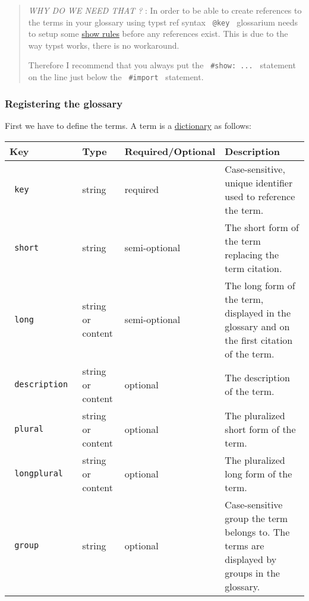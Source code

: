 \begin{Shaded}
\begin{Highlighting}[]
\end{Highlighting}
\end{Shaded}

\begin{quote}
\emph{WHY DO WE NEED THAT ?} : In order to be able to create references
to the terms in your glossary using typst ref syntax \texttt{\ @key\ }
glossarium needs to setup some
\href{https://typst.app/docs/tutorial/advanced-styling/}{show rules}
before any references exist. This is due to the way typst works, there
is no workaround.

Therefore I recommend that you always put the \texttt{\ \#show:\ ...\ }
statement on the line just below the \texttt{\ \#import\ } statement.
\end{quote}

\subsubsection{Registering the glossary}\label{registering-the-glossary}

First we have to define the terms. A term is a
\href{https://typst.app/docs/reference/types/dictionary/}{dictionary} as
follows:

\begin{longtable}[]{@{}llll@{}}
\toprule\noalign{}
Key & Type & Required/Optional & Description \\
\midrule\noalign{}
\endhead
\bottomrule\noalign{}
\endlastfoot
\texttt{\ key\ } & string & required & Case-sensitive, unique identifier
used to reference the term. \\
\texttt{\ short\ } & string & semi-optional & The short form of the term
replacing the term citation. \\
\texttt{\ long\ } & string or content & semi-optional & The long form of
the term, displayed in the glossary and on the first citation of the
term. \\
\texttt{\ description\ } & string or content & optional & The
description of the term. \\
\texttt{\ plural\ } & string or content & optional & The pluralized
short form of the term. \\
\texttt{\ longplural\ } & string or content & optional & The pluralized
long form of the term. \\
\texttt{\ group\ } & string & optional & Case-sensitive group the term
belongs to. The terms are displayed by groups in the glossary. \\
\end{longtable}

